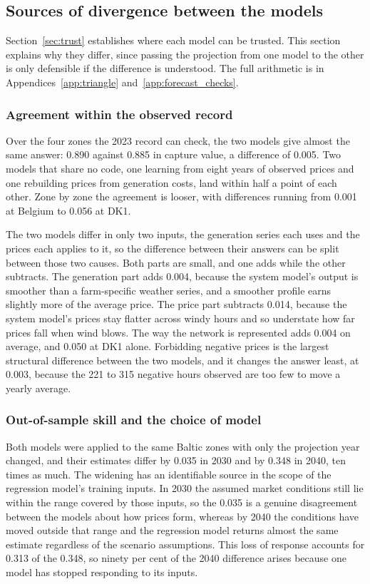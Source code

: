 \subsection{Sources of divergence between the models}\label{sec:why_differ}

Section~\ref{sec:trust} establishes where each model can be trusted. This
section explains why they differ, since passing the projection from one model to
the other is only defensible if the difference is understood. The full
arithmetic is in Appendices~\ref{app:triangle} and~\ref{app:forecast_checks}.

\subsubsection{Agreement within the observed record}\label{sec:gap_decomposition}

Over the four zones the 2023 record can check, the two models give almost the
same answer: 0.890 against 0.885 in capture value, a difference of 0.005. Two
models that share no code, one learning from eight years of observed prices and
one rebuilding prices from generation costs, land within half a point of each
other. Zone by zone the agreement is looser, with differences running from 0.001
at Belgium to 0.056 at DK1.

The two models differ in only two inputs, the generation series each uses and
the prices each applies to it, so the difference between their answers can be
split between those two causes. Both parts are small, and one adds while the
other subtracts. The generation part adds 0.004, because the system model's
output is smoother than a farm-specific weather series, and a smoother profile
earns slightly more of the average price. The price part subtracts 0.014,
because the system model's prices stay flatter across windy hours and so
understate how far prices fall when wind blows. The way the network is
represented adds 0.004 on average, and 0.050 at DK1 alone. Forbidding negative
prices is the largest structural difference between the two models, and it
changes the answer least, at 0.003, because the 221 to 315 negative hours
observed are too few to move a yearly average.

\subsubsection{Out-of-sample skill and the choice of model}\label{sec:skill}

Both models were applied to the same Baltic zones with only the projection
year changed, and their estimates differ by 0.035 in 2030 and by 0.348 in
2040, ten times as much. The widening has an identifiable source in the scope
of the regression model's training inputs. In 2030 the assumed market
conditions still lie within the range covered by those inputs, so the 0.035 is
a genuine disagreement between the models about how prices form, whereas by
2040 the conditions have moved outside that range and the regression model
returns almost the same estimate regardless of the scenario assumptions. This
loss of response accounts for 0.313 of the 0.348, so ninety per cent of the
2040 difference arises because one model has stopped responding to its inputs.

